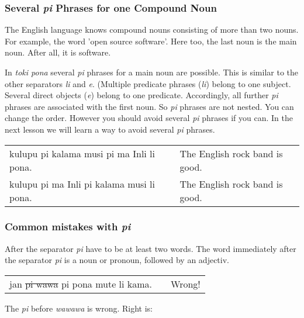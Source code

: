 %
\subsubsection*{Several \textit{pi} Phrases for one Compound Noun} 
%

The English language knows compound nouns consisting of more than two nouns. 
For example, the word 'open source software'.  
Here too, the last noun is the main noun. 
After all, it is software. 

In \textit{toki pona} several \textit{pi} phrases for a main noun are possible. 
This is similar to the other separators \textit{li} and \textit{e}. 
(Multiple predicate phrases (\textit{li}) belong to one subject. 
Several direct objects (\textit{e}) belong to one predicate.
Accordingly, all further \textit{pi} phrases are associated with the first noun. 
So \textit{pi} phrases are not nested. 
You can change the order. 
However you should avoid several \textit{pi} phrases if you can. 
In the next lesson we will learn a way to avoid several \textit{pi} phrases.

\begin{supertabular}{p{5,5cm}|ll}
kulupu pi kalama musi pi ma Inli li pona. &&  The English rock band is good. \\ 
kulupu pi ma Inli pi kalama musi li pona. &&  The English rock band is good. \\ 
\end{supertabular}

% 
\subsubsection*{Common mistakes with \textit{pi}}
\label{'mistakes_with_pi'}
%
%
After the separator \textit{pi} have to be at least two words. 
The word immediately after the separator \textit{pi} is a noun or pronoun, followed by an adjectiv.

\begin{supertabular}{p{5,5cm}|ll}
jan \sout{pi wawa} pi pona mute li kama. && Wrong! \\ %
\end{supertabular}

The \textit{pi} before \textit{wawawa} is wrong. 
Right is: 

